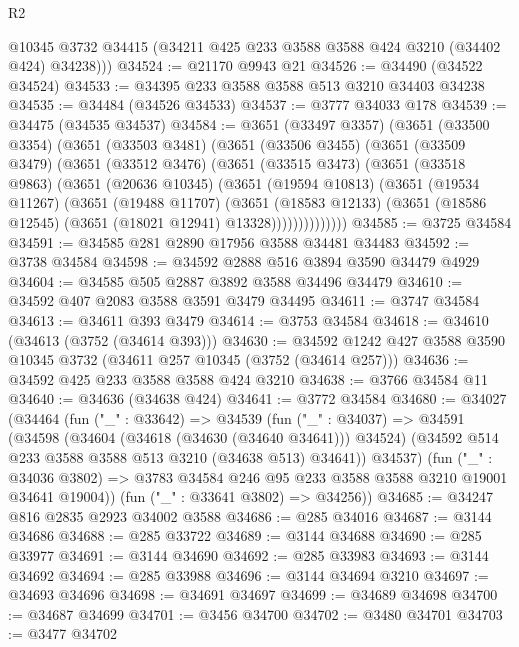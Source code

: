 \begin{lexlean}{R2}
\begin{coremodule}
        @10345
        @3732
        @34415
        (@34211 @425 @233 @3588 @3588 @424 @3210 (@34402 @424) @34238)))
@34524 := @21170 @9943 @21
@34526 := @34490 (@34522 @34524)
@34533 := @34395 @233 @3588 @3588 @513 @3210 @34403 @34238
@34535 := @34484 (@34526 @34533)
@34537 := @3777 @34033 @178
@34539 := @34475 (@34535 @34537)
@34584 := @3651
    (@33497 @3357)
    (@3651
      (@33500 @3354)
      (@3651
        (@33503 @3481)
        (@3651
          (@33506 @3455)
          (@3651
            (@33509 @3479)
            (@3651
              (@33512 @3476)
              (@3651
                (@33515 @3473)
                (@3651
                  (@33518 @9863)
                  (@3651
                    (@20636 @10345)
                    (@3651
                      (@19594 @10813)
                      (@3651
                        (@19534 @11267)
                        (@3651
                          (@19488 @11707)
                          (@3651
                            (@18583 @12133)
                            (@3651 (@18586 @12545) (@3651 (@18021 @12941) @13328))))))))))))))
@34585 := @3725 @34584
@34591 := @34585 @281 @2890 @17956 @3588 @34481 @34483
@34592 := @3738 @34584
@34598 := @34592 @2888 @516 @3894 @3590 @34479 @4929
@34604 := @34585 @505 @2887 @3892 @3588 @34496 @34479
@34610 := @34592 @407 @2083 @3588 @3591 @3479 @34495
@34611 := @3747 @34584
@34613 := @34611 @393 @3479
@34614 := @3753 @34584
@34618 := @34610 (@34613 (@3752 (@34614 @393)))
@34630 := @34592 @1242 @427 @3588 @3590 @10345 @3732 (@34611 @257 @10345 (@3752 (@34614 @257)))
@34636 := @34592 @425 @233 @3588 @3588 @424 @3210
@34638 := @3766 @34584 @11
@34640 := @34636 (@34638 @424)
@34641 := @3772 @34584
@34680 := @34027
    (@34464
      (fun ("_" : @33642) =>
      @34539
        (fun ("_" : @34037) =>
        @34591
          (@34598
            (@34604 (@34618 (@34630 (@34640 @34641))) @34524)
            (@34592 @514 @233 @3588 @3588 @513 @3210 (@34638 @513) @34641))
          @34537)
        (fun ("_" : @34036 @3802) =>
        @3783 @34584 @246 @95 @233 @3588 @3588 @3210 @19001 @34641 @19004))
      (fun ("_" : @33641 @3802) => @34256))
@34685 := @34247 @816 @2835 @2923 @34002 @3588
@34686 := @285 @34016
@34687 := @3144 @34686
@34688 := @285 @33722
@34689 := @3144 @34688
@34690 := @285 @33977
@34691 := @3144 @34690
@34692 := @285 @33983
@34693 := @3144 @34692
@34694 := @285 @33988
@34696 := @3144 @34694 @3210
@34697 := @34693 @34696
@34698 := @34691 @34697
@34699 := @34689 @34698
@34700 := @34687 @34699
@34701 := @3456 @34700
@34702 := @3480 @34701
@34703 := @3477 @34702

\end{coremodule}
\end{lexlean}

